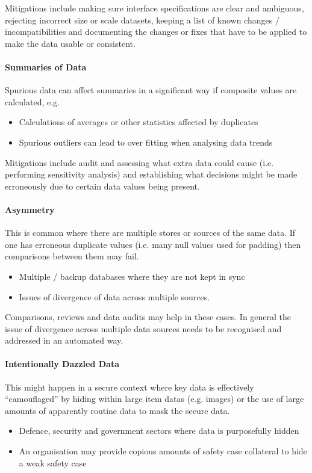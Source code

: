 Mitigations include making sure interface specifications are clear and ambiguous, rejecting incorrect size or scale \glspl{dataset}, keeping a list of known changes / incompatibilities and documenting the changes or fixes that have to be applied to make the data usable or consistent.

\paragraph{Summaries of Data}
Spurious data can affect summaries in a significant way if composite values are calculated, e.g.
\begin{itemize}
    \item Calculations of averages or other statistics affected by duplicates
    \item Spurious outliers can lead to over fitting when analysing data trends
\end{itemize}

Mitigations include audit and assessing what extra data could cause (i.e. performing sensitivity analysis) and establishing what decisions might be made erroneously due to certain data values being present.	

\paragraph{ Asymmetry}
This is common where there are multiple stores or sources of the same data. If one has erroneous duplicate values (i.e. many null values used for padding) then comparisons between them may fail.
\begin{itemize}
    \item Multiple / backup \glspl{database} where they are not kept in sync
    \item Issues of divergence of data across multiple sources.
\end{itemize}

Comparisons, reviews and data audits may help in these cases. In general the issue of divergence across multiple data sources needs to be recognised and addressed in an automated way.

\paragraph{Intentionally Dazzled Data}
This might happen in a secure context where key data is effectively ``camouflaged'' by hiding within large \glspl{item data} (e.g. images) or the use of large amounts of apparently routine data to mask the secure data.
\begin{itemize}
    \item Defence, security and government sectors where data is purposefully hidden 
    \item An organisation may provide copious amounts of safety case collateral to hide a weak safety case
\end{itemize}
